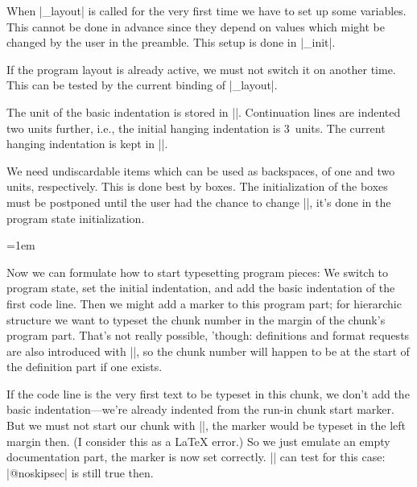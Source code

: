 \documentclass{progltx}
\begin{document}
\sect When |\cwbb@program_layout| is called for the very first time
we have to set up some variables. This cannot be done in advance
since they depend on values which might be changed by the user in the
preamble. This setup is done in |\cwbb@layout_init|.

If the program layout is already active, we must not switch it on
another time. This can be tested by the current binding of
|\cwbb@doc_layout|.

\beginprog
\def\cwbb@program_layout{%
    \ifx \cwbb@doc_layout\relax
	\cwbb@layout_init
	\cwbb@save_doc_layout
	\def\cwbb@doc_layout{%
	    \cwbb@restore_doc_layout
	    \let\cwbb@doc_layout\relax
	    }%
	\parskip\z@skip
	\rightskip\z@ plus 100\p@ minus 10\p@
	\sfcode`\;=3000
	\pretolerance\@M
	\hyphenpenalty 1000	%
	\exhyphenpenalty\@M
    \fi
    }
\endprog


\sect The unit of the basic indentation is stored in
|\CwebIndentUnit|. Continuation lines are indented two units further,
i.e., the initial hanging indentation is 3~units. The current hanging
indentation is kept in |\cwbb@indent|.

We need undiscardable items which can be used as backspaces, of one
and two units, respectively. This is done best by boxes. The
initialization of the boxes must be postponed until the user had the
chance to change |\CwebIndentUnit|, it's done in the program state
initialization.

\beginprog
\newdimen\CwebIndentUnit
	\CwebIndentUnit=1em
\newdimen\cwbb@indent

\newbox\cwbb@bak	%
\newbox\cwbb@bakk	%

\def\cwbb@layout_init{%
    \global\setbox\cwbb@bak \hbox to -1\CwebIndentUnit{}%
    \global\setbox\cwbb@bakk \hbox to -2\CwebIndentUnit{}%
    \global\let\cwbb@layout_init\relax
    }
\endprog


\sect Now we can formulate how to start typesetting program pieces: We
switch to program state, set the initial indentation, and add the
basic indentation of the first code line. Then we might add a marker
to this program part; for hierarchic structure we want to typeset the
chunk number in the margin of the chunk's program part. That's not
really possible, 'though: definitions and format requests are also
introduced with |\B|, so the chunk number will happen to be at the
start of the definition part if one exists.

If the code line is the very first text to be typeset in this chunk,
we don't add the basic indentation---we're already indented from the
run-in chunk start marker. But we must not start our chunk with
|\noindent|, the marker would be typeset in the left margin then. (I
consider this as a \LaTeX{} error.) So we just emulate an empty
documentation part, the marker is now set correctly. |\B| can test for
this case: |@noskipsec| is still true then.
\end{document}

